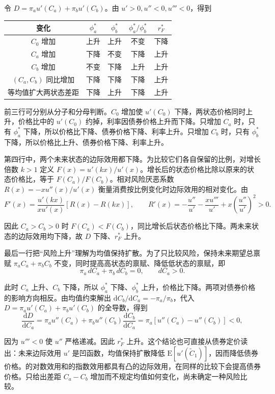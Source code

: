 \begin{solution}[blank-type=manual,blank-vsep=12\baselineskip]
\begin{enumerate}[label=(\alph*)]
 令 $D=\pi_au'(C_a)+\pi_bu'(C_b)$。由 $u'>0,u''<0,u'''<0$，得到
 \begin{center}
 \begin{tabular}{c|cccc}
 变化&$\phi_a^*$&$\phi_b^*$&$\phi_a^*/\phi_b^*$&$r_F^*$\\\hline
 $C_0$ 增加&上升&上升&不变&下降\\
 $C_a$ 增加&下降&不变&下降&上升\\
 $C_b$ 增加&不变&下降&上升&上升\\
 $(C_a,C_b)$ 同比增加&下降&下降&下降&上升\\
 等均值扩大两状态差距&下降&上升&下降&上升
 \end{tabular}
 \end{center}

 前三行可分别从分子和分母判断。$C_0$ 增加使 $u'(C_0)$ 下降，两状态价格同时上升，价格比中的 $u'(C_0)$ 约掉，利率因债券价格上升而下降。只增加 $C_a$ 时，只有 $\phi_a^*$ 下降，所以价格比下降、债券价格下降、利率上升。只增加 $C_b$ 时，只有 $\phi_b^*$ 下降，所以价格比上升、债券价格下降、利率上升。

 第四行中，两个未来状态的边际效用都下降。为比较它们各自保留的比例，对增长倍数 $k>1$ 定义 $F(x)=u'(kx)/u'(x)$。增长后的状态价格比除以原来的状态价格比，等于 $F(C_a)/F(C_b)$。相对风险厌恶系数 $R(x)=-xu''(x)/u'(x)$ 衡量消费按比例变化时边际效用的相对变化。由
 \[
 F'(x)=\frac{u'(kx)}{xu'(x)}[R(x)-R(kx)],\qquad
 R'(x)=-\frac{u''}{u'}-\frac{xu'''}{u'}+x\left(\frac{u''}{u'}\right)^2>0.
 \]

 因此 $C_a>C_b>0$ 时 $F(C_a)<F(C_b)$，同比增长后状态价格比下降。两未来状态的边际效用均下降，故 $D$ 下降、$r_F^*$ 上升。

 最后一行把“风险上升”理解为均值保持扩散。为了只比较风险，保持未来期望总禀赋 $\pi_aC_a+\pi_bC_b$ 不变，同时提高高状态的禀赋、降低低状态的禀赋，即
 \[
 \pi_a\,dC_a+\pi_b\,dC_b=0,\qquad dC_a>0.
 \]

 此时 $C_a$ 上升、$C_b$ 下降，所以 $\phi_a^*$ 下降、$\phi_b^*$ 上升，价格比下降。两项对债券价格的影响方向相反。由均值约束解出 $\mathrm d C_b/\mathrm d C_a=-\pi_a/\pi_b$，代入 $D=\pi_a u'(C_a)+\pi_b u'(C_b)$ 的全导数，得到
 \[
 \frac{\mathrm dD}{\mathrm dC_a}
 =\pi_a u''(C_a)+\pi_b u''(C_b)\frac{\mathrm dC_b}{\mathrm dC_a}
 =\pi_a[u''(C_a)-u''(C_b)]<0,
 \]

 因为 $u'''<0$ 使 $u''$ 严格递减。因此 $r_F^*$ 上升。这个结论也可直接从债券定价读出：未来边际效用 $u'$ 是凹函数，均值保持扩散降低 $\mathrm E[u'(\widetilde C_1)]$，因而降低债券价格。的对数效用和的指数效用都具有凸的边际效用，在同样的比较下会提高债券价格。只给出差距 $C_a-C_b$ 增加而不规定均值如何变化，尚未确定一种风险比较。
\end{enumerate}
\end{solution}

